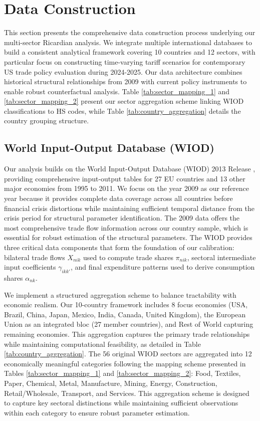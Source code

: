 \section{Data Construction}

This section presents the comprehensive data construction process underlying our multi-sector Ricardian analysis. We integrate multiple international databases to build a consistent analytical framework covering 10 countries and 12 sectors, with particular focus on constructing time-varying tariff scenarios for contemporary US trade policy evaluation during 2024-2025. Our data architecture combines historical structural relationships from 2009 with current policy instruments to enable robust counterfactual analysis. Table \ref{tab:sector_mapping_1} and \ref{tab:sector_mapping_2} present our sector aggregation scheme linking WIOD classifications to HS codes, while Table \ref{tab:country_aggregation} details the country grouping structure.

\subsection{World Input-Output Database (WIOD)}

Our analysis builds on the World Input-Output Database (WIOD) 2013 Release \citep{timmer2015illustrated}, providing comprehensive input-output tables for 27 EU countries and 13 other major economies from 1995 to 2011. We focus on the year 2009 as our reference year because it provides complete data coverage across all countries before financial crisis distortions while maintaining sufficient temporal distance from the crisis period for structural parameter identification. The 2009 data offers the most comprehensive trade flow information across our country sample, which is essential for robust estimation of the structural parameters. The WIOD provides three critical data components that form the foundation of our calibration: bilateral trade flows $X_{nik}$ used to compute trade shares $\pi_{nik}$, sectoral intermediate input coefficients $\gamma_{ikk'}$, and final expenditure patterns used to derive consumption shares $\alpha_{nk}$.

We implement a structured aggregation scheme to balance tractability with economic realism. Our 10-country framework includes 8 focus economies (USA, Brazil, China, Japan, Mexico, India, Canada, United Kingdom), the European Union as an integrated bloc (27 member countries), and Rest of World capturing remaining economies. This aggregation captures the primary trade relationships while maintaining computational feasibility, as detailed in Table \ref{tab:country_aggregation}. The 56 original WIOD sectors are aggregated into 12 economically meaningful categories following the mapping scheme presented in Tables \ref{tab:sector_mapping_1} and \ref{tab:sector_mapping_2}: Food, Textiles, Paper, Chemical, Metal, Manufacture, Mining, Energy, Construction, Retail/Wholesale, Transport, and Services. This aggregation scheme is designed to capture key sectoral distinctions while maintaining sufficient observations within each category to ensure robust parameter estimation.

